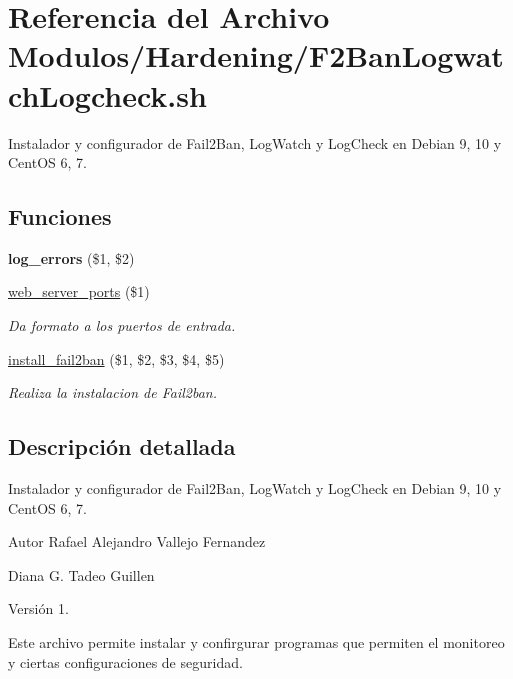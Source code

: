 \hypertarget{F2BanLogwatchLogcheck_8sh}{}\section{Referencia del Archivo Modulos/\+Hardening/\+F2\+Ban\+Logwatch\+Logcheck.sh}
\label{F2BanLogwatchLogcheck_8sh}


Instalador y configurador de Fail2\+Ban, Log\+Watch y Log\+Check en Debian 9, 10 y Cent\+OS 6, 7.  


\subsection*{Funciones}
\begin{DoxyCompactItemize}
\item 
\mbox{\label{F2BanLogwatchLogcheck_8sh_a92067b58a8478c9841b2cd9b75ea3565}} 
{\bfseries log\+\_\+errors} (\$1, \$2)
\item 
\hyperlink{F2BanLogwatchLogcheck_8sh_a5c1106882b059a6588637f440e6b5758}{web\+\_\+server\+\_\+ports} (\$1)
\begin{DoxyCompactList}\small\item\em Da formato a los puertos de entrada. \end{DoxyCompactList}\item 
\hyperlink{F2BanLogwatchLogcheck_8sh_a63476174140e4513bd22005ca9679602}{install\+\_\+fail2ban} (\$1, \$2, \$3, \$4, \$5)
\begin{DoxyCompactList}\small\item\em Realiza la instalacion de Fail2ban. \end{DoxyCompactList}\end{DoxyCompactItemize}


\subsection{Descripción detallada}
Instalador y configurador de Fail2\+Ban, Log\+Watch y Log\+Check en Debian 9, 10 y Cent\+OS 6, 7. 

\begin{DoxyAuthor}{Autor}
Rafael Alejandro Vallejo Fernandez 

Diana G. Tadeo Guillen 
\end{DoxyAuthor}
\begin{DoxyVersion}{Versión}
1.
\end{DoxyVersion}
Este archivo permite instalar y confirgurar programas que permiten el monitoreo y ciertas configuraciones de seguridad. 

